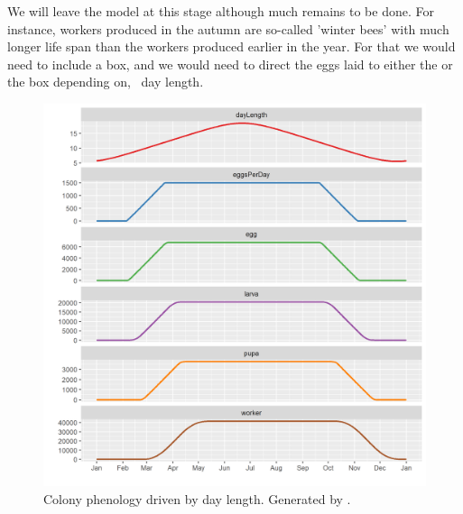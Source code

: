 
We will leave the model at this stage although much remains to be done. For instance, workers produced in the autumn are so-called 'winter bees' with much longer life span than the workers produced earlier in the year. For that we would need to include a  box, and we would need to direct the eggs laid to either the  or the  box depending on, \eg\ day length.


\begin{figure}
\centering
\includegraphics[width=\textwidth]{graphics/honeybee2}
\caption{Colony phenology driven by day length. Generated by .}
\label{fig:honeybee2}
\end{figure}
